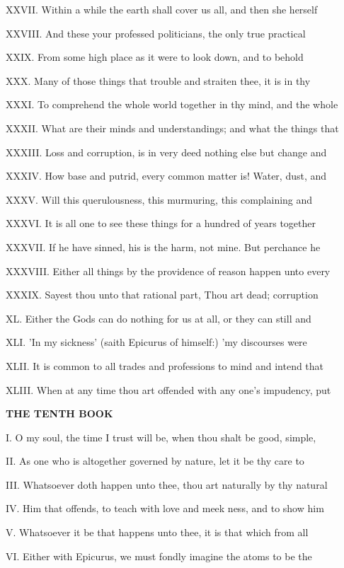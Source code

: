 XXVII. Within a while the earth shall cover us
all, and then she herself

XXVIII. And these your professed politicians,
the only true practical

XXIX. From some high place as it were to look
down, and to behold

XXX. Many of those things that trouble and
straiten thee, it is in thy

XXXI. To comprehend the whole world together
in thy mind, and the whole

XXXII. What are their minds and
understandings; and what the things that

XXXIII. Loss and corruption, is in very deed
nothing else but change and

XXXIV. How base and putrid, every common
matter is! Water, dust, and

XXXV. Will this querulousness, this murmuring,
this complaining and

XXXVI. It is all one to see these things for a
hundred of years together

XXXVII. If he have sinned, his is the harm,
not mine. But perchance he

XXXVIII. Either all things by the providence
of reason happen unto every

XXXIX. Sayest thou unto that rational part,
Thou art dead; corruption

XL. Either the Gods can do nothing for us at
all, or they can still and

XLI. 'In my sickness' (saith Epicurus of
himself:) 'my discourses were

XLII. It is common to all trades and
professions to mind and intend that

XLIII. When at any time thou art offended with
any one's impudency, put

\textbf{THE TENTH BOOK}

I. O my soul, the time I trust will be, when
thou shalt be good, simple,

II. As one who is altogether governed by
nature, let it be thy care to

III. Whatsoever doth happen unto thee, thou
art naturally by thy natural

IV. Him that offends, to teach with love and
meek ness, and to show him

V. Whatsoever it be that happens unto thee, it
is that which from all

VI. Either with Epicurus, we must fondly
imagine the atoms to be the

